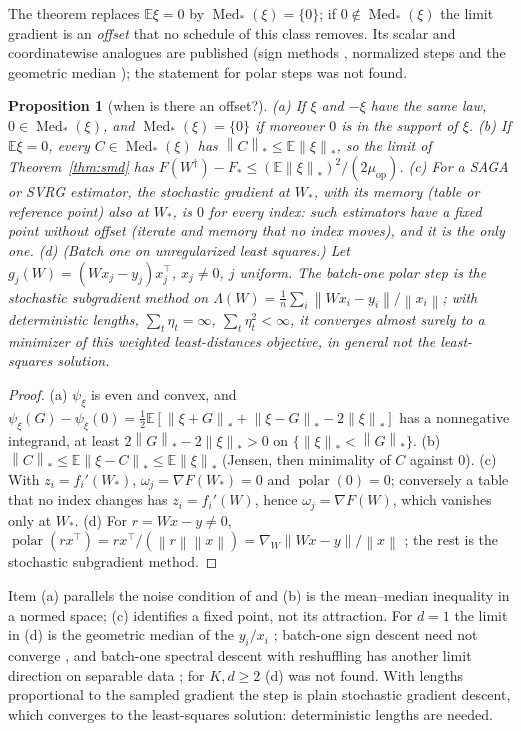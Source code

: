 \documentclass[10pt]{article}
\newtheorem{proposition}[theorem]{Proposition}
\theoremstyle{remark}
\newcommand{\E}{\mathbb{E}}
\newcommand{\norm}[1]{\left\|#1\right\|}
\newcommand{\nnuc}[1]{\left\|#1\right\|_{*}}
\newcommand{\polar}{\operatorname{polar}}
\newcommand{\Med}{\operatorname{Med}_\ast}
\newcommand{\muop}{\mu_{\mathrm{op}}}
\begin{document}
The theorem replaces $\E\xi=0$ by $\Med(\xi)=\{0\}$; if $0\notin\Med(\xi)$ the limit gradient is an \emph{offset} that no schedule of
this class removes. Its scalar and coordinatewise analogues are published (sign methods \cite{chen2020distributed},
normalized steps and the geometric median \cite{cardot2013efficient}); the statement for polar steps was not found.

\begin{proposition}[when is there an offset?]\label{prop:comp}
(a) If $\xi$ and $-\xi$ have the same law, $0\in\Med(\xi)$, and $\Med(\xi)=\{0\}$ if moreover $0$ is in the support of
$\xi$. (b) If $\E\xi=0$, every $C\in\Med(\xi)$ has $\nnuc C\le\E\nnuc\xi$, so the limit of Theorem~\ref{thm:smd} has
$F(W^\dagger)-F_\ast\le(\E\nnuc\xi)^2/(2\muop)$. (c) For a SAGA or SVRG estimator, the stochastic gradient at $W_\ast$, with
its memory (table or reference point) also at $W_\ast$, is $0$ for every index: such estimators have a fixed point without
offset (iterate and memory that no index moves), and it is the only one. (d) (Batch one on unregularized least squares.) Let
$g_j(W)=(Wx_j-y_j)x_j^\top$, $x_j\ne0$, $j$ uniform. The batch-one polar step is the stochastic subgradient method on
$\Lambda(W)=\frac1n\sum_i\norm{Wx_i-y_i}/\norm{x_i}$; with deterministic lengths, $\sum_t\eta_t=\infty$,
$\sum_t\eta_t^2<\infty$, it converges almost surely to a minimizer of this weighted least-distances objective, in
general not the least-squares solution.
\end{proposition}
\begin{proof}
(a) $\psi_\xi$ is even and convex, and $\psi_\xi(G)-\psi_\xi(0)=\frac12\E[\nnuc{\xi+G}+\nnuc{\xi-G}-2\nnuc\xi]$ has a
nonnegative integrand, at least $2\nnuc G-2\nnuc\xi>0$ on $\{\nnuc\xi<\nnuc G\}$. (b) $\nnuc C\le\E\nnuc{\xi-C}\le\E\nnuc\xi$
(Jensen, then minimality of $C$ against $0$). (c) With $z_i=f_i'(W_\ast)$, $\omega_j=\nabla F(W_\ast)=0$ and
$\polar(0)=0$; conversely a table that no index changes has $z_i=f_i'(W)$, hence $\omega_j=\nabla F(W)$, which vanishes
only at $W_\ast$. (d) For $r=Wx-y\ne0$, $\polar(rx^\top)=rx^\top/(\norm r\norm x)=\nabla_W\norm{Wx-y}/\norm x$
\cite[Lemma~H.1]{li2026implicit}; the rest is the stochastic subgradient method.
\end{proof}

Item (a) parallels the noise condition of \cite{bernstein2019majority} and (b) is the mean--median inequality in a normed
space; (c) identifies a fixed point, not its attraction. For $d=1$ the limit in (d) is the geometric median of the
$y_i/x_i$ \cite{cardot2013efficient}; batch-one sign descent need not converge \cite{karimireddy2019error}, and batch-one
spectral descent with reshuffling has another limit direction on separable data \cite[Theorem~4.10]{li2026implicit};
for $K,d\ge2$ (d) was not found. With lengths proportional to the sampled gradient the step is plain stochastic
gradient descent, which converges to the least-squares solution: deterministic lengths are needed.
\end{document}
